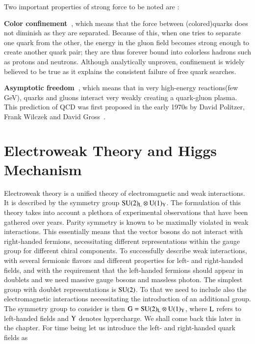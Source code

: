 Two important properties of strong force to be noted are :

{\bf Color confinement~\cite{APichQCD}}, which means that the force between (colored)quarks does not diminish as they are separated. Because of this, when one tries to separate one quark from the other, the energy in the gluon field becomes strong enough to create another quark pair; they are thus forever bound into colorless hadrons such as protons and neutrons. Although analytically unproven, confinement is widely believed to be true as it explains the consistent failure of free quark searches.

{\bf Asymptotic freedom~\cite{APichQCD}}, which means that in very high-energy reactions(few GeV), quarks and gluons interact very weakly creating a quark-gluon plasma. This prediction of QCD was first proposed in the early 1970s by David Politzer, Frank Wilczek and David Gross~\cite{AsympQCD1, AsympQCD2}. 





\section{Electroweak Theory and Higgs Mechanism}

Electroweak theory is a unified theory of electromagnetic and weak interactions. It is described by the symmetry group $\rm SU(2)_{L} \otimes U(1)_{Y}$. The formulation of this theory takes into account a plethora of experimental observations that have been gathered over years. Parity symmetry is known to be maximally violated in weak interactions. This essentially means that the vector bosons do not interact with right-handed fermions, necessitating different representations within the gauge group for different chiral components.  To successfully describe  weak interactions, with several fermionic  flavors and different properties for left- and right-handed fields, and with the requirement that the left-handed fermions should appear in doublets and  we need massive gauge  bosons and massless photon. The simplest group with doublet representations is $\rm SU(2)$. To that we need to include also the electromagnetic interactions necessitating the introduction of an additional group. The symmetry group to consider is then $\rm G = SU(2)_{L}\otimes U(1)_{Y}$, where $\rm L$ refers to left-handed fields and $\rm Y$ denotes hypercharge. We shall come back this later in the chapter. For time being let us introduce the left- and right-handed quark fields as

